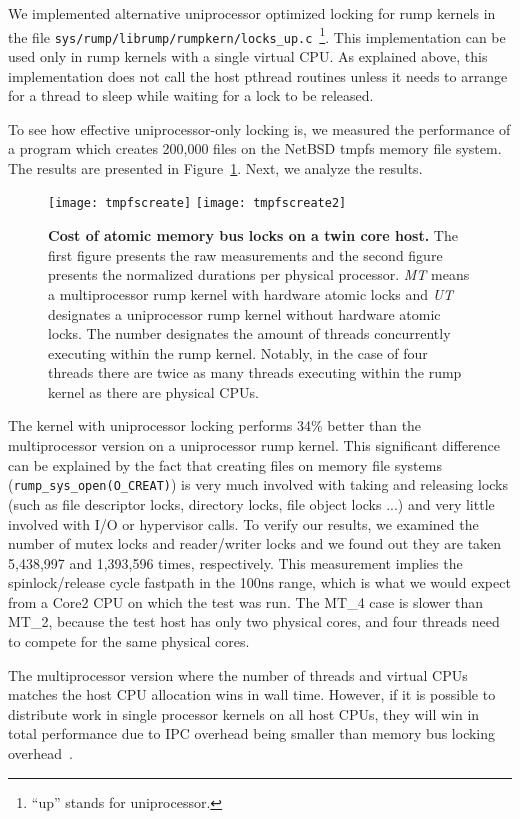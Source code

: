 We implemented alternative uniprocessor optimized locking for rump
kernels in the file \verb+sys/rump/librump/rumpkern/locks_up.c+~\footnote
{
	``up'' stands for uniprocessor.
}.
This implementation can be used only in rump kernels with
a single virtual CPU.  As explained above, this implementation
does not call the host pthread routines unless it needs to arrange
for a thread to sleep while waiting for a lock to be released.

To see how effective uniprocessor-only locking is, we measured the
performance of a program which creates 200,000 files on the NetBSD
tmpfs memory file system.  The results are presented in
Figure~\ref{fig:tmpfscreate}.  Next, we analyze the results.

\begin{figure}[t]
\texttt{[image: tmpfscreate]}
\texttt{[image: tmpfscreate2]}
\caption[Cost of atomic memory bus locks on a twin core host]{
\textbf{Cost of atomic memory bus locks on a twin core host.}
The first figure presents the raw measurements and the second figure
presents the normalized durations per physical processor.
\textit{MT} means a multiprocessor rump kernel with hardware atomic
locks and \textit{UT} designates a uniprocessor rump kernel without
hardware atomic locks.  The number designates the amount of threads
concurrently executing within the rump kernel.  Notably,
in the case of four threads there are twice as many threads executing
within the rump kernel as there are physical CPUs.
}
\label{fig:tmpfscreate}
\end{figure}
\clearpage

The kernel with uniprocessor locking performs 34\% better than the
multiprocessor version on a uniprocessor rump kernel.  This significant
difference can be explained by the fact that creating files on
memory file systems (\verb+rump_sys_open(O_CREAT)+) is very
much involved with taking and releasing locks (such as file descriptor
locks, directory locks, file object locks ...) and very little
involved with I/O or hypervisor calls.  To verify our results, we
examined the number of mutex locks and reader/writer locks and we
found out they are taken 5,438,997 and 1,393,596 times, respectively.
This measurement implies the spinlock/release cycle fastpath in the 100ns range,
which is what we would expect from a Core2 CPU on which the test was
run.  The MT\_4 case is slower than MT\_2, because the test host has
only two physical cores, and four threads need to compete for the same
physical cores.

The multiprocessor version where the number of threads and virtual
CPUs matches the host CPU allocation wins in wall time.  However,
if it is possible to distribute work in single processor kernels
on all host CPUs, they will win in total performance due to
IPC overhead being smaller than memory bus locking
overhead~\cite{baumann:multikernel}.

